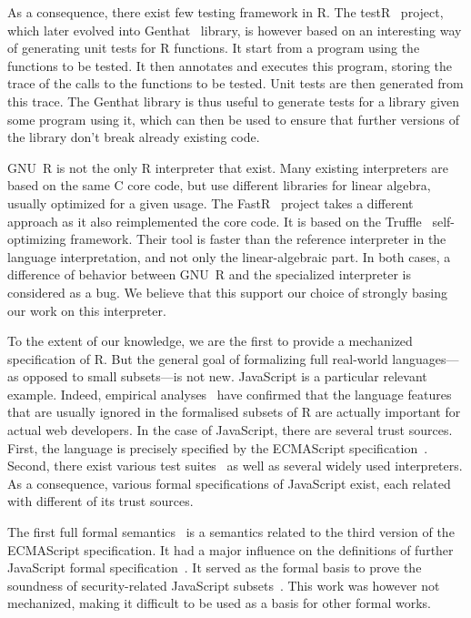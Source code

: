 \documentclass[
    sigplan,
    10pt,
    review, %
    natbib=false %
 ]{acmart}
\begin{document}
As a consequence,
there exist few testing framework in R.
The testR~\parencite{maj2013testr, 2014testr} project,
which later evolved into Genthat~\parencite{genthat} library,
is however based on an interesting way of generating unit tests for R functions.
It start from a program using the functions to be tested.
It then annotates and executes this program,
storing the trace of the calls to the functions to be tested.
Unit tests are then generated from this trace.
The Genthat library is thus useful to generate tests for a library
given some program using it,
which can then be used to ensure that further versions of the library
don't break already existing code.

GNU~R is not the only R interpreter that exist.
Many existing interpreters are based on the same C core code,
but use different libraries for linear algebra,
usually optimized for a given usage.
%
The FastR~\parencite{kalibera2014fast} project takes a different approach
as it also reimplemented the core code.
It is based on the Truffle~\parencite{wuerthingertruffle}
self-optimizing framework.
Their tool is faster than the reference interpreter
in the language interpretation, and not only the linear-algebraic part.
%
In both cases, a difference of behavior between GNU~R
and the specialized interpreter is considered as a bug.
We believe that this support our choice of strongly basing
our work on this interpreter.

To the extent of our knowledge,
we are the first to provide a mechanized specification of R.
But the general goal of formalizing full real-world languages---%
as opposed to small subsets---is not new.
%
JavaScript is a particular relevant example.
Indeed, empirical analyses~\parencite{RichardsHBV11}
have confirmed that the language features
that are usually ignored in the formalised subsets of R
are actually important for actual web developers.
%
In the case of JavaScript, there are several trust sources.
First, the language is precisely specified by the ECMAScript specification~\parencite{es2019}.
Second, there exist various test suites~\parencite{test262, mozillatests}
as well as several widely used interpreters.
As a consequence, various formal specifications of JavaScript exist,
each related with different of its trust sources.

The first full formal semantics~\parencite{aplas08}
is a semantics related to the third version of the ECMAScript specification.
It had a major influence on the definitions of further JavaScript formal
specification~\parencite{ses, popl14jscert, popl12-Towards, usenix}.
It served as the formal basis to prove the soundness of security-related
JavaScript subsets~\parencite{MMT-CSF-TR09, mmt-esorics09, mmt-oakland10}.
This work was however not mechanized, making it difficult to be used
as a basis for other formal works.
\end{document}
